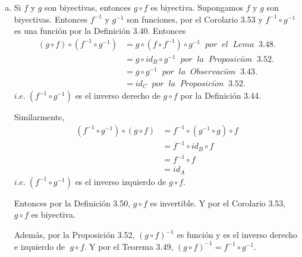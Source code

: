 \documentclass[letterpaper,11pt]{article}
\begin{document}
  \begin{adjustwidth}{1cm}{0cm}
    \begin{enumerate}[(a)]
      \item  Si $f$ y $g$ son biyectivas, entonces $g \circ f$ es biyectiva. \newline
        Supongamos $f$ y $g$ son biyectivas. \newline
        Entonces $f^{-1}$ y $g^{-1}$ son funciones, por el Corolario 3.53
        y $f^{-1} \circ g^{-1}$ es una función por la Definición 3.40. \newline
        Entonces
        \begin{align*}
          (g \circ f) \circ (f^{-1} \circ g^{-1}) &= g \circ (f \circ f^{-1}) \circ g^{-1} \;\;
          por \;\; el \;\; Lema \;\; 3.48. \\
          &= g \circ id_{B} \circ g^{-1} \;\; por \;\; la \;\; Proposici\acute{o}n \;\; 3.52. \\
          &= g \circ g^{-1} \;\; por \;\; la \;\; Observaci\acute{o}n \;\; 3.43. \\
          &= id_{C} \;\; por \;\; la \;\; Proposici\acute{o}n \;\; 3.52.
        \end{align*}
        $i.e. \; (f^{-1} \circ g^{-1})$ es el inverso derecho de $g \circ f$ por la Definición 3.44. \newline

        Similarmente,
        \begin{align*}
          (f^{-1} \circ g^{-1}) \circ (g \circ f) &= f^{-1} \circ (g^{-1} \circ g) \circ f \\
          &= f^{-1} \circ id_{B} \circ f \\
          &= f^{-1} \circ f \\
          &= id_{A}
        \end{align*}
        $i.e. \; (f^{-1} \circ g^{-1})$ es el inverso izquierdo de $g \circ f$. \newline

        Entonces por la Definición 3.50, $g \circ f$ es invertible. \newline
        Y por el Corolario 3.53, $g \circ f$ es biyectiva. \newline

        Además, por la Proposición 3.52, $(g \circ f)^{-1}$ es función y es el inverso derecho e izquierdo de $\; g \circ f$. \newline
        Y por el Teorema 3.49, $(g \circ f)^{-1} = f^{-1} \circ g^{-1}$.


\end{enumerate}
\end{adjustwidth}
\end{document}
